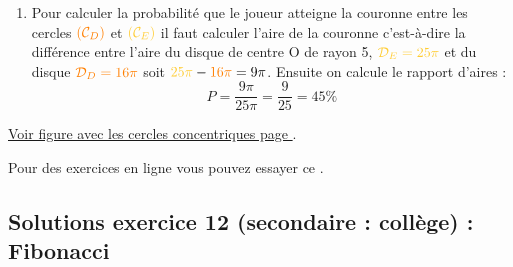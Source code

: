 \begin{enumerate}[label=G\arabic*)]
\item Pour calculer la probabilité que le joueur atteigne la couronne entre les cercles $\textcolor{orange}{(\mathcal{C}_{D})}$ et $\textcolor{yellow}{(\mathcal{C}_{E})}$  il faut calculer l'aire de la couronne c'est-à-dire la différence entre l'aire du disque de centre O de rayon 5, $\textcolor{yellow}{ \mathcal{D}_{E}  = 25\pi }$ et du disque $\textcolor{orange}{\mathcal{D}_{D} = 16\pi}$ soit $\textcolor{yellow}{25\pi} - \textcolor{orange}{16\pi} = 9\pi$. Ensuite on calcule le rapport d'aires : \[P = \dfrac{9\pi}{25\pi} = \dfrac{9}{25} = 45\%\] 
\end{enumerate}

\hyperref[fig:proba-target]{Voir figure avec les cercles concentriques page \pageref{fig:proba-target}}.

Pour des exercices en ligne vous pouvez essayer ce  .


\newpage

\subsection{Solutions exercice 12 (secondaire : collège) : Fibonacci}

\label{sol:niveau12} 


